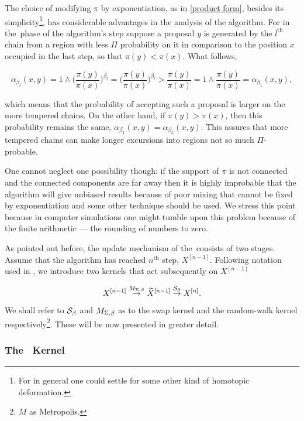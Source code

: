The choice of modifying $\pi$ by exponentiation, as in \ref{product form}, besides its simplicity\footnote{For in general one could settle for some other kind of homotopic deformation.}, has considerable advantages in the analysis of the algorithm. For in the \randomWalk\,phase of the algorithm's step suppose a proposal $y$ is generated by the $l^\text{th}$ chain from a region with less $\Pi$ probability on it in comparison to the position $x$ occupied in the last step, so that $\pi(y) < \pi(x)$. What follows,

$$ 
	\alpha_{\beta_l}(x,y) =  1 \wedge \Biggl(\frac{\pi(y)}{\pi(x)}\Biggl)^{\beta_l} = 
	\Biggl(\frac{\pi(y)}{\pi(x)}\Biggl)^{\beta_l} > \frac{\pi(y)}{\pi(x)} = 1 \wedge \frac{\pi(y)}{\pi(x)} = \alpha_{\beta_1}(x,y),
$$

which means that the probability of accepting such a proposal is larger on the more tempered chains. On the other hand, if  $\pi(y) > \pi(x)$, then this probability remains the same, $\alpha_{\beta_1}(x,y) = \alpha_{\beta_k}(x,y)$. This assures that more tempered chains can make longer excursions into regions not so much $\Pi$-probable. 

One cannot neglect one possibility though: if the support of $\pi$ is not connected and the connected components are far away then it is highly improbable that the algorithm will give unbiased results because of poor mixing that cannot be fixed by exponentiation and some other technique should be used. We stress this point because in computer simulations one might tumble upon this problem because of the finite arithmetic --- the rounding of numbers to zero.    

As pointed out before, the update mechanism of the \PT\,consists of two stages. Assume that the algorithm has reached $n^\text{th}$ step, $X^{[n-1]}$. Following notation used in \citet*{BM1}, we introduce two kernels that act subsequently on $X^{[n-1]}$

$$X^{[n-1]} \overset{M_{\Sigma,\beta}}{\rightarrow} \widetilde{X}^{[n-1]} \overset{\mathcal{S}_{\beta}}{\rightarrow} X^{[n]}.$$

We shall refer to $\mathcal{S}_{\beta}$ and $M_{\Sigma,\beta}$ as to the swap kernel and the random-walk kernel respectively\footnote{$M$ as Metropolis.}. These will be now presented in greater detail.



	\subsubsection*{The \randomWalk\, Kernel}
	
